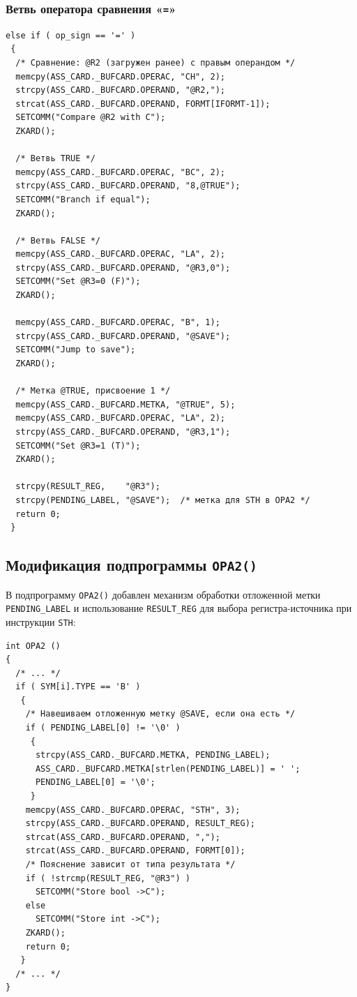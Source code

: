 \documentclass[a4paper,14pt]{extarticle}
\begin{document}
\subsubsection*{Ветвь оператора сравнения «\texttt{=}»}

\begin{lstlisting}[style=Cstyle,caption={Ветвь \texttt{AVI2()} для операции «=»},label=lst:avi2eq]
else if ( op_sign == '=' )
 {
  /* Сравнение: @R2 (загружен ранее) с правым операндом */
  memcpy(ASS_CARD._BUFCARD.OPERAC, "CH", 2);
  strcpy(ASS_CARD._BUFCARD.OPERAND, "@R2,");
  strcat(ASS_CARD._BUFCARD.OPERAND, FORMT[IFORMT-1]);
  SETCOMM("Compare @R2 with C");
  ZKARD();

  /* Ветвь TRUE */
  memcpy(ASS_CARD._BUFCARD.OPERAC, "BC", 2);
  strcpy(ASS_CARD._BUFCARD.OPERAND, "8,@TRUE");
  SETCOMM("Branch if equal");
  ZKARD();

  /* Ветвь FALSE */
  memcpy(ASS_CARD._BUFCARD.OPERAC, "LA", 2);
  strcpy(ASS_CARD._BUFCARD.OPERAND, "@R3,0");
  SETCOMM("Set @R3=0 (F)");
  ZKARD();

  memcpy(ASS_CARD._BUFCARD.OPERAC, "B", 1);
  strcpy(ASS_CARD._BUFCARD.OPERAND, "@SAVE");
  SETCOMM("Jump to save");
  ZKARD();

  /* Метка @TRUE, присвоение 1 */
  memcpy(ASS_CARD._BUFCARD.METKA, "@TRUE", 5);
  memcpy(ASS_CARD._BUFCARD.OPERAC, "LA", 2);
  strcpy(ASS_CARD._BUFCARD.OPERAND, "@R3,1");
  SETCOMM("Set @R3=1 (T)");
  ZKARD();

  strcpy(RESULT_REG,    "@R3");
  strcpy(PENDING_LABEL, "@SAVE");  /* метка для STH в OPA2 */
  return 0;
 }
\end{lstlisting}

\subsection{Модификация подпрограммы \texttt{OPA2()}}

В подпрограмму \texttt{OPA2()} добавлен механизм обработки отложенной метки
\texttt{PENDING\_LABEL} и использование \texttt{RESULT\_REG} для выбора
регистра-источника при инструкции \texttt{STH}:

\begin{lstlisting}[style=Cstyle,caption={Модификация подпрограммы \texttt{OPA2()}},label=lst:opa2]
int OPA2 ()
{
  /* ... */
  if ( SYM[i].TYPE == 'B' )
   {
    /* Навешиваем отложенную метку @SAVE, если она есть */
    if ( PENDING_LABEL[0] != '\0' )
     {
      strcpy(ASS_CARD._BUFCARD.METKA, PENDING_LABEL);
      ASS_CARD._BUFCARD.METKA[strlen(PENDING_LABEL)] = ' ';
      PENDING_LABEL[0] = '\0';
     }
    memcpy(ASS_CARD._BUFCARD.OPERAC, "STH", 3);
    strcpy(ASS_CARD._BUFCARD.OPERAND, RESULT_REG);
    strcat(ASS_CARD._BUFCARD.OPERAND, ",");
    strcat(ASS_CARD._BUFCARD.OPERAND, FORMT[0]);
    /* Пояснение зависит от типа результата */
    if ( !strcmp(RESULT_REG, "@R3") )
      SETCOMM("Store bool ->C");
    else
      SETCOMM("Store int ->C");
    ZKARD();
    return 0;
   }
  /* ... */
}
\end{lstlisting}
\end{document}
